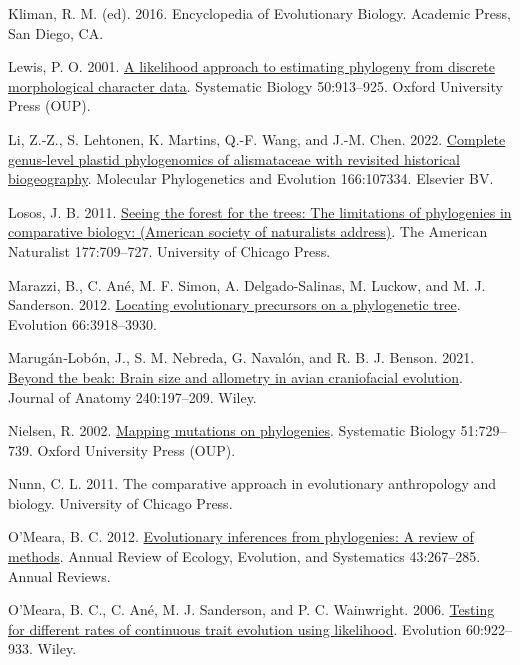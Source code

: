 \documentclass{article}
\newlength{\cslhangindent}
\newenvironment{CSLReferences}[2] %
 {\begin{list}{}{%
  \setlength{\itemindent}{0pt}
  \setlength{\leftmargin}{0pt}
  \setlength{\parsep}{0pt}
  \ifodd #1
   \setlength{\leftmargin}{\cslhangindent}
   \setlength{\itemindent}{-1\cslhangindent}
  \fi
  \setlength{\itemsep}{#2\baselineskip}}}
 {\end{list}}
\begin{document}
\begin{CSLReferences}{1}{0}
Kliman, R. M. (ed). 2016. {E}ncyclopedia of {E}volutionary {B}iology. Academic Press, San Diego, CA.

Lewis, P. O. 2001. \href{https://doi.org/10.1080/106351501753462876}{A likelihood approach to estimating phylogeny from discrete morphological character data}. Systematic Biology 50:913--925. Oxford University Press (OUP).

Li, Z.-Z., S. Lehtonen, K. Martins, Q.-F. Wang, and J.-M. Chen. 2022. \href{https://doi.org/10.1016/j.ympev.2021.107334}{Complete genus-level plastid phylogenomics of alismataceae with revisited historical biogeography}. Molecular Phylogenetics and Evolution 166:107334. Elsevier BV.

Losos, J. B. 2011. \href{https://doi.org/10.1086/660020}{Seeing the forest for the trees: The limitations of phylogenies in comparative biology: (American society of naturalists address)}. The American Naturalist 177:709--727. University of Chicago Press.

Marazzi, B., C. Ané, M. F. Simon, A. Delgado-Salinas, M. Luckow, and M. J. Sanderson. 2012. \href{https://doi.org/10.1111/j.1558-5646.2012.01720.x}{Locating evolutionary precursors on a phylogenetic tree}. Evolution 66:3918--3930.

Marugán‐Lobón, J., S. M. Nebreda, G. Navalón, and R. B. J. Benson. 2021. \href{https://doi.org/10.1111/joa.13555}{Beyond the beak: Brain size and allometry in avian craniofacial evolution}. Journal of Anatomy 240:197--209. Wiley.

Nielsen, R. 2002. \href{https://doi.org/10.1080/10635150290102393}{Mapping mutations on phylogenies}. Systematic Biology 51:729--739. Oxford University Press (OUP).

Nunn, C. L. 2011. The comparative approach in evolutionary anthropology and biology. University of Chicago Press.

O'Meara, B. C. 2012. \href{https://doi.org/10.1146/annurev-ecolsys-110411-160331}{Evolutionary inferences from phylogenies: A review of methods}. Annual Review of Ecology, Evolution, and Systematics 43:267--285. Annual Reviews.

O'Meara, B. C., C. Ané, M. J. Sanderson, and P. C. Wainwright. 2006. \href{https://doi.org/10.1111/j.0014-3820.2006.tb01171.x}{Testing for different rates of continuous trait evolution using likelihood}. Evolution 60:922--933. Wiley.


\end{CSLReferences}
\end{document}
